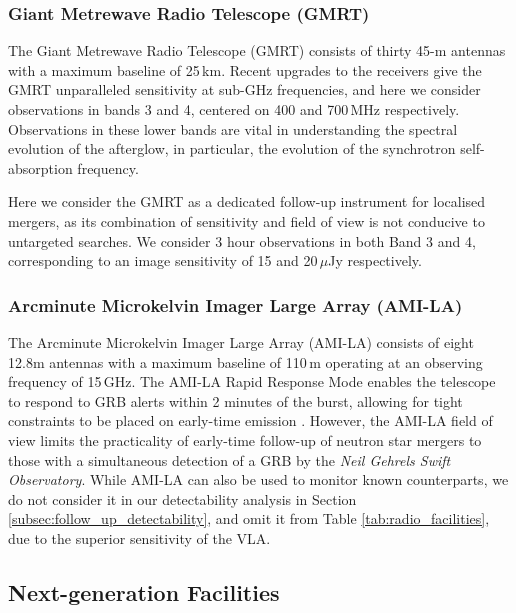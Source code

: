 \subsubsection{Giant Metrewave Radio Telescope (GMRT)}
The Giant Metrewave Radio Telescope (GMRT) consists of thirty 45-m antennas with a maximum baseline of 25\,km. Recent upgrades to the receivers give the GMRT unparalleled sensitivity at sub-GHz frequencies, and here we consider observations in bands 3 and 4, centered on 400 and 700\,MHz respectively. Observations in these lower bands are vital in understanding the spectral evolution of the afterglow, in particular, the evolution of the synchrotron self-absorption frequency.

Here we consider the GMRT as a dedicated follow-up instrument for localised mergers, as its combination of sensitivity and field of view is not conducive to untargeted searches. We consider 3 hour observations in both Band 3 and 4, corresponding to an image sensitivity of 15 and 20$\,\mu$Jy respectively.

\subsubsection{Arcminute Microkelvin Imager Large Array (AMI-LA)}
The Arcminute Microkelvin Imager Large Array (AMI-LA) consists of eight 12.8m antennas with a maximum baseline of 110\,m operating at an observing frequency of 15\,GHz. The AMI-LA Rapid Response Mode \citep[ALARRM;][]{2013MNRAS.428.3114S} enables the telescope to respond to GRB alerts within 2 minutes of the burst, allowing for tight constraints to be placed on early-time emission \citep[e.g.][]{2019MNRAS.489.1820L}. However, the AMI-LA field of view limits the practicality of early-time follow-up of neutron star mergers to those with a simultaneous detection of a GRB by the \textit{Neil Gehrels Swift Observatory}. While AMI-LA can also be used to monitor known counterparts, we do not consider it in our detectability analysis in Section \ref{subsec:follow_up_detectability}, and omit it from Table \ref{tab:radio_facilities}, due to the superior sensitivity of the VLA.

\subsection{Next-generation Facilities}
\label{subsec:nextgen_facilities}
